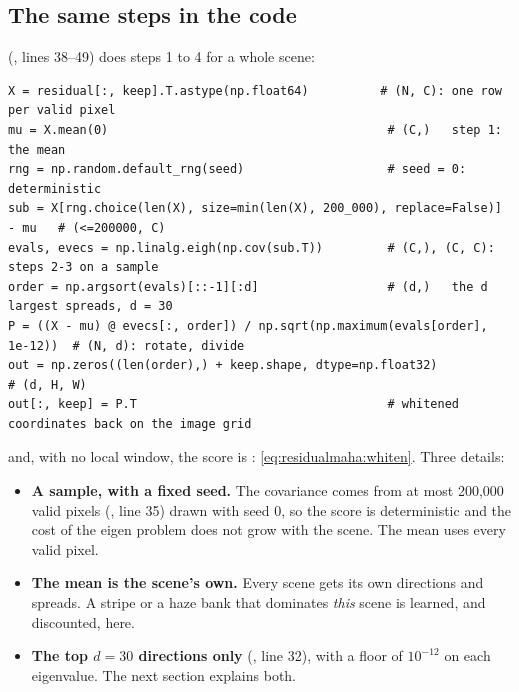 
\subsection{The same steps in the code}

 (, lines 38--49) does steps 1 to 4 for a whole scene:
\begin{lstlisting}
X = residual[:, keep].T.astype(np.float64)          # (N, C): one row per valid pixel
mu = X.mean(0)                                       # (C,)   step 1: the mean
rng = np.random.default_rng(seed)                    # seed = 0: deterministic
sub = X[rng.choice(len(X), size=min(len(X), 200_000), replace=False)] - mu   # (<=200000, C)
evals, evecs = np.linalg.eigh(np.cov(sub.T))         # (C,), (C, C): steps 2-3 on a sample
order = np.argsort(evals)[::-1][:d]                  # (d,)   the d largest spreads, d = 30
P = ((X - mu) @ evecs[:, order]) / np.sqrt(np.maximum(evals[order], 1e-12))  # (N, d): rotate, divide
out = np.zeros((len(order),) + keep.shape, dtype=np.float32)                 # (d, H, W)
out[:, keep] = P.T                                   # whitened coordinates back on the image grid
\end{lstlisting}
and, with no local window, the score is : \cref{eq:residualmaha:whiten}. Three
details:
\begin{itemize}
\item \textbf{A sample, with a fixed seed.} The covariance comes from at most 200,000 valid pixels
  (, line 35) drawn with seed 0, so the score is deterministic and the cost of the eigen
  problem does not grow with the scene. The mean uses every valid pixel.
\item \textbf{The mean is the scene's own.} Every scene gets its own directions and spreads. A stripe or a
  haze bank that dominates \emph{this} scene is learned, and discounted, here.
\item \textbf{The top $d=30$ directions only} (, line 32), with a floor of $10^{-12}$
  on each eigenvalue. The next section explains both.
\end{itemize}

